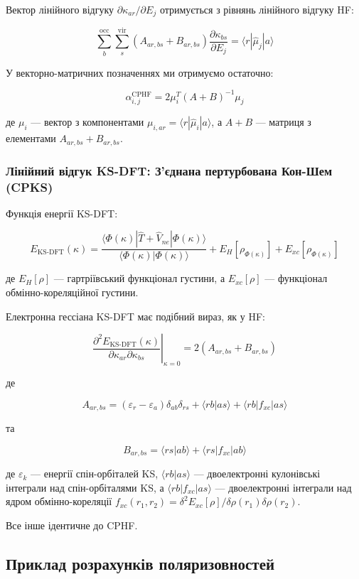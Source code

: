 \documentclass{PySCFBook}
\begin{document}
Вектор лінійного відгуку \(\partial \kappa_{ar} / \partial E_j\) отримується з рівнянь лінійного відгуку HF:

\[\sum_b^{\text{occ}} \sum_s^{\text{vir}} (A_{ar,bs} + B_{ar,bs}) \frac{\partial \kappa_{bs}}{\partial E_j} = \langle r | \hat{\mu}_j | a \rangle\]

У векторно-матричних позначеннях ми отримуємо остаточно:

\[\alpha^{\text{CPHF}}_{i,j} = 2 \mu_i^T (A + B)^{-1} \mu_j\]

де \(\mu_i\) — вектор з компонентами \(\mu_{i,ar} = \langle r | \hat{\mu}_i | a \rangle\), а \(A + B\) — матриця з елементами \(A_{ar,bs} + B_{ar,bs}\).

\subsubsection{Лінійний відгук KS-DFT: З'єднана пертурбована Кон-Шем (CPKS)}

Функція енергії KS-DFT:

\[E_{\text{KS-DFT}}(\kappa) = \frac{\langle \Phi(\kappa) | \hat{T} + \hat{V}_{ne} | \Phi(\kappa) \rangle}{\langle \Phi(\kappa) | \Phi(\kappa) \rangle} + E_H[\rho_{\Phi(\kappa)}] + E_{xc}[\rho_{\Phi(\kappa)}]\]

де \(E_H[\rho]\) — гартріївський функціонал густини, а \(E_{xc}[\rho]\) — функціонал обмінно-кореляційної густини.

Електронна гессіана KS-DFT має подібний вираз, як у HF:

\[\left. \frac{\partial^2 E_{\text{KS-DFT}}(\kappa)}{\partial \kappa_{ar} \partial \kappa_{bs}} \right|_{\kappa=0} = 2 (A_{ar,bs} + B_{ar,bs})\]

де

\[A_{ar,bs} = (\varepsilon_r - \varepsilon_a) \delta_{ab} \delta_{rs} + \langle rb | as \rangle + \langle rb | f_{xc} | as \rangle\]

та

\[B_{ar,bs} = \langle rs | ab \rangle + \langle rs | f_{xc} | ab \rangle\]

де \(\varepsilon_k\) — енергії спін-орбіталей KS, \(\langle rb | as \rangle\) — двоелектронні кулонівські інтеграли над спін-орбіталями KS, а \(\langle rb | f_{xc} | as \rangle\) — двоелектронні інтеграли над ядром обмінно-кореляції \(f_{xc}(r_1, r_2) = \delta^2 E_{xc}[\rho] / \delta \rho(r_1) \delta \rho(r_2)\).

Все інше ідентичне до CPHF.

\subsection{Приклад розрахунків поляризовностей}
\end{document}

